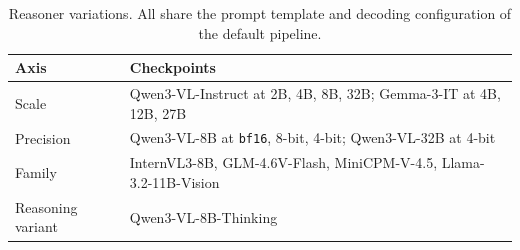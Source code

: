 \begin{table}[h]
\centering
\small
\begin{tabular}{ll}
\toprule
Axis & Checkpoints \\
\midrule
Scale & Qwen3-VL-Instruct at 2B, 4B, 8B, 32B; Gemma-3-IT at 4B, 12B, 27B \\
Precision & Qwen3-VL-8B at \texttt{bf16}, 8-bit, 4-bit; Qwen3-VL-32B at 4-bit \\
Family & InternVL3-8B, GLM-4.6V-Flash, MiniCPM-V-4.5, Llama-3.2-11B-Vision \\
Reasoning variant & Qwen3-VL-8B-Thinking \\
\bottomrule
\end{tabular}
\caption{Reasoner variations. All share the prompt template and decoding configuration of the default pipeline.}
\label{tab:reasoners}
\end{table}